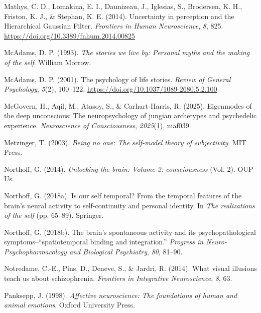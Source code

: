 \documentclass[
  jou,
  floatsintext,
  longtable,
  nolmodern,
  notxfonts,
  notimes,
  12pt,
  colorlinks=true,linkcolor=blue,citecolor=blue,urlcolor=blue]{apa7}
\newlength{\cslhangindent}
\newenvironment{CSLReferences}[2] %
 {\begin{list}{}{%
  \setlength{\itemindent}{0pt}
  \setlength{\leftmargin}{0pt}
  \setlength{\parsep}{0pt}
  \ifodd #1
   \setlength{\leftmargin}{\cslhangindent}
   \setlength{\itemindent}{-1\cslhangindent}
  \fi
  \setlength{\itemsep}{#2\baselineskip}}}
 {\end{list}}
\begin{document}
\begin{CSLReferences}{1}{0}
Mathys, C. D., Lomakina, E. I., Daunizeau, J., Iglesias, S., Brodersen,
K. H., Friston, K. J., \& Stephan, K. E. (2014). Uncertainty in
perception and the {Hierarchical} {Gaussian} {Filter}. \emph{Frontiers
in Human Neuroscience}, \emph{8}, 825.
\url{https://doi.org/10.3389/fnhum.2014.00825}

McAdams, D. P. (1993). \emph{The stories we live by: Personal myths and
the making of the self}. William Morrow.

McAdams, D. P. (2001). The psychology of life stories. \emph{Review of
General Psychology}, \emph{5}(2), 100--122.
\url{https://doi.org/10.1037/1089-2680.5.2.100}

McGovern, H., Aqil, M., Atasoy, S., \& Carhart-Harris, R. (2025).
Eigenmodes of the deep unconscious: The neuropsychology of jungian
archetypes and psychedelic experience. \emph{Neuroscience of
Consciousness}, \emph{2025}(1), niaf039.

Metzinger, T. (2003). \emph{Being no one: The self-model theory of
subjectivity}. MIT Press.

Northoff, G. (2014). \emph{Unlocking the brain: Volume 2: consciousness}
(Vol. 2). OUP Us.

Northoff, G. (2018a). Is our self temporal? From the temporal features
of the brain's neural activity to self-continuity and personal identity.
In \emph{The realizations of the self} (pp. 65--89). Springer.

Northoff, G. (2018b). The brain's spontaneous activity and its
psychopathological symptoms--{``spatiotemporal binding and
integration.''} \emph{Progress in Neuro-Psychopharmacology and
Biological Psychiatry}, \emph{80}, 81--90.

Notredame, C.-E., Pins, D., Deneve, S., \& Jardri, R. (2014). What
visual illusions teach us about schizophrenia. \emph{Frontiers in
Integrative Neuroscience}, \emph{8}, 63.

Panksepp, J. (1998). \emph{Affective neuroscience: The foundations of
human and animal emotions}. Oxford University Press.


\end{CSLReferences}
\end{document}
